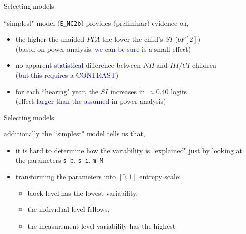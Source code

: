 %
%
\begin{lhframe}[rhgraphic={\texttt{[image: select\_model1.png]}}]
	{Selecting models}
	
	``simplest" model (\texttt{E\_NC2b}) provides (preliminar) evidence on,
	\begin{itemize}
		\item the higher the unaided $PTA$ the lower the child's $SI$ ($bP[2]$)\\
		{\small (based on power analysis, \textcolor{blue}{we can be sure} is a small effect) }
		\item no apparent \textcolor{blue}{statistical} difference between $NH$ and $HI/CI$ children \\
		{\small (\textcolor{blue}{but this requires a CONTRAST}) }
		\item for each ``hearing" year, the $SI$ increases in $\approx 0.40$ logits \\
		{\small (effect \textcolor{blue}{larger than the assumed} in power analysis) }
	\end{itemize}
\end{lhframe}
%
%
\begin{lhframe}[rhgraphic={\texttt{[image: variability\_plot.pdf]}}]
	{Selecting models}
	
	additionally the ``simplest" model tells us that,
	\begin{itemize}
		\item it is hard to determine how the variability is ``explained" just by looking at the parameters \texttt{s\_b}, \texttt{s\_i}, \texttt{m\_M}
		\item transforming the parameters into $[0,1]$ entropy scale:
		\begin{itemize}
			\item block level has the lowest variability,
			\item the individual level follows,
			\item the measurement level variability has the highest
		\end{itemize}
	\end{itemize}
\end{lhframe}
%
%
